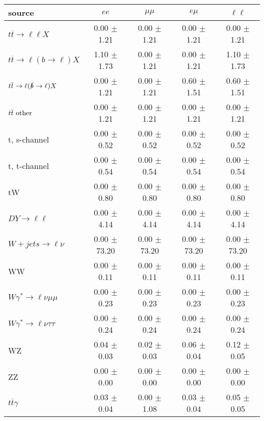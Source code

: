 \begin{tabular}{l|cccc} \hline\hline
source & $ee$ & $\mu\mu$ & $e\mu$ & $\ell\ell $ \\
\hline
$t\overline{t} \rightarrow \ell \ell X$ &  0.00 $\pm$  1.21 &  0.00 $\pm$  1.21 &  0.00 $\pm$  1.21 &  0.00 $\pm$  1.21 \\
$t\overline{t} \rightarrow \ell (b \rightarrow \ell) X$ &  1.10 $\pm$  1.73 &  0.00 $\pm$  1.21 &  0.00 $\pm$  1.21 &  1.10 $\pm$  1.73 \\
$t\overline{t} \rightarrow \ell (\slashed b \rightarrow \ell) X$ &  0.00 $\pm$  1.21 &  0.00 $\pm$  1.21 &  0.60 $\pm$  1.51 &  0.60 $\pm$  1.51 \\
        $t\overline{t}\ \rm{other}$ &  0.00 $\pm$  1.21 &  0.00 $\pm$  1.21 &  0.00 $\pm$  1.21 &  0.00 $\pm$  1.21 \\
\hline
                       t, s-channel &  0.00 $\pm$  0.52 &  0.00 $\pm$  0.52 &  0.00 $\pm$  0.52 &  0.00 $\pm$  0.52 \\
                       t, t-channel &  0.00 $\pm$  0.54 &  0.00 $\pm$  0.54 &  0.00 $\pm$  0.54 &  0.00 $\pm$  0.54 \\
                                 tW &  0.00 $\pm$  0.80 &  0.00 $\pm$  0.80 &  0.00 $\pm$  0.80 &  0.00 $\pm$  0.80 \\
\hline
         $DY \rightarrow \ell \ell$ &  0.00 $\pm$  4.14 &  0.00 $\pm$  4.14 &  0.00 $\pm$  4.14 &  0.00 $\pm$  4.14 \\
      $W+jets \rightarrow \ell \nu$ &  0.00 $\pm$ 73.20 &  0.00 $\pm$ 73.20 &  0.00 $\pm$ 73.20 &  0.00 $\pm$ 73.20 \\
                                 WW &  0.00 $\pm$  0.11 &  0.00 $\pm$  0.11 &  0.00 $\pm$  0.11 &  0.00 $\pm$  0.11 \\
\hline
$W\gamma^{*} \rightarrow \ell \nu \mu\mu$ &  0.00 $\pm$  0.23 &  0.00 $\pm$  0.23 &  0.00 $\pm$  0.23 &  0.00 $\pm$  0.23 \\
$W\gamma^{*} \rightarrow \ell \nu \tau\tau$ &  0.00 $\pm$  0.24 &  0.00 $\pm$  0.24 &  0.00 $\pm$  0.24 &  0.00 $\pm$  0.24 \\
                                 WZ &  0.04 $\pm$  0.03 &  0.02 $\pm$  0.03 &  0.06 $\pm$  0.04 &  0.12 $\pm$  0.05 \\
                                 ZZ &  0.00 $\pm$  0.00 &  0.00 $\pm$  0.00 &  0.00 $\pm$  0.00 &  0.00 $\pm$  0.00 \\
\hline
              $t\overline{t}\gamma$ &  0.03 $\pm$  0.04 &  0.00 $\pm$  1.08 &  0.03 $\pm$  0.04 &  0.05 $\pm$  0.05 \\

\end{tabular}

